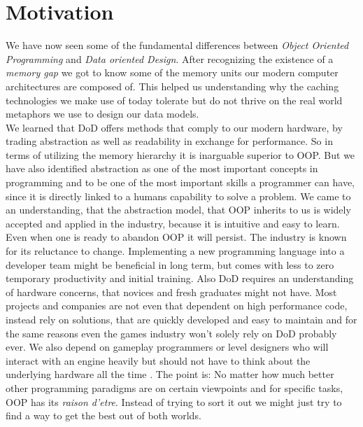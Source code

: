 \chapter{Motivation}\label{motivation}
We have now seen some of the fundamental differences between \textit{Object Oriented Programming} and \textit{Data oriented Design}. After recognizing the existence of a \textit{memory gap} we got to know some of the memory units our modern computer architectures are composed of. This helped us understanding why the caching technologies we make use of today tolerate but do not thrive on the real world metaphors we use to design our data models.\\
We learned that DoD offers methods that comply to our modern hardware, by trading abstraction as well as readability in exchange for performance. So in terms of utilizing the memory hierarchy it is inarguable superior to OOP. But we have also identified abstraction as one of the most important concepts in programming  and to be one of the most important skills a programmer can have, since it is directly linked to a humans capability to solve a problem. We came to an understanding, that the abstraction model, that OOP inherits to us is widely accepted and applied in the industry, because it is intuitive and easy to learn.\\
Even when one is ready to abandon OOP it will persist. The industry is known for its reluctance to change. Implementing a new programming language into a developer team might be beneficial in long term, but comes with less to zero temporary productivity and initial training. Also DoD requires an understanding of hardware concerns, that novices and fresh graduates might not have. Most projects and companies are not even that dependent on high performance code, instead rely on solutions, that are quickly developed and easy to maintain and for the same reasons even the games industry won't solely rely on DoD probably ever. We also depend on gameplay programmers or level designers who will interact with an engine heavily but should not have to think about the underlying hardware all the time . The point is: No matter how much better other programming paradigms are on certain viewpoints and for specific tasks, OOP has its \textit{raison d'etre}. Instead of trying to sort it out we might just try to find a way to get the best out of both worlds.

